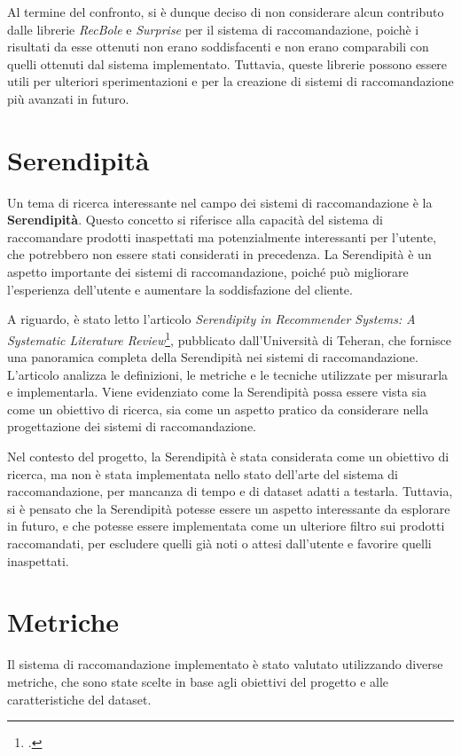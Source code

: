 Al termine del confronto, si è dunque deciso di non considerare alcun contributo dalle librerie \emph{RecBole} e \emph{Surprise} per il sistema di raccomandazione, poichè i risultati da esse ottenuti non erano soddisfacenti e non erano comparabili con quelli ottenuti dal sistema implementato. Tuttavia, queste librerie possono essere utili per ulteriori sperimentazioni e per la creazione di sistemi di raccomandazione più avanzati in futuro.


\section{Serendipità}

Un tema di ricerca interessante nel campo dei sistemi di raccomandazione è la \textbf{Serendipità}. Questo concetto si riferisce alla capacità del sistema di raccomandare prodotti inaspettati ma potenzialmente interessanti per l'utente, che potrebbero non essere stati considerati in precedenza. La Serendipità è un aspetto importante dei sistemi di raccomandazione, poiché può migliorare l'esperienza dell'utente e aumentare la soddisfazione del cliente.

A riguardo, è stato letto l'articolo \emph{Serendipity in Recommender Systems: A Systematic Literature Review}\footcite{article:serendipity-recommender-systems}, pubblicato dall'Università di Teheran, che fornisce una panoramica completa della Serendipità nei sistemi di raccomandazione. L'articolo analizza le definizioni, le metriche e le tecniche utilizzate per misurarla e implementarla. Viene evidenziato come la Serendipità possa essere vista sia come un obiettivo di ricerca, sia come un aspetto pratico da considerare nella progettazione dei sistemi di raccomandazione.

Nel contesto del progetto, la Serendipità è stata considerata come un obiettivo di ricerca, ma non è stata implementata nello stato dell'arte del sistema di raccomandazione, per mancanza di tempo e di dataset adatti a testarla. Tuttavia, si è pensato che la Serendipità potesse essere un aspetto interessante da esplorare in futuro, e che potesse essere implementata come un ulteriore filtro sui prodotti raccomandati, per escludere quelli già noti o attesi dall'utente e favorire quelli inaspettati.


\section{Metriche}

Il sistema di raccomandazione implementato è stato valutato utilizzando diverse metriche, che sono state scelte in base agli obiettivi del progetto e alle caratteristiche del dataset.

